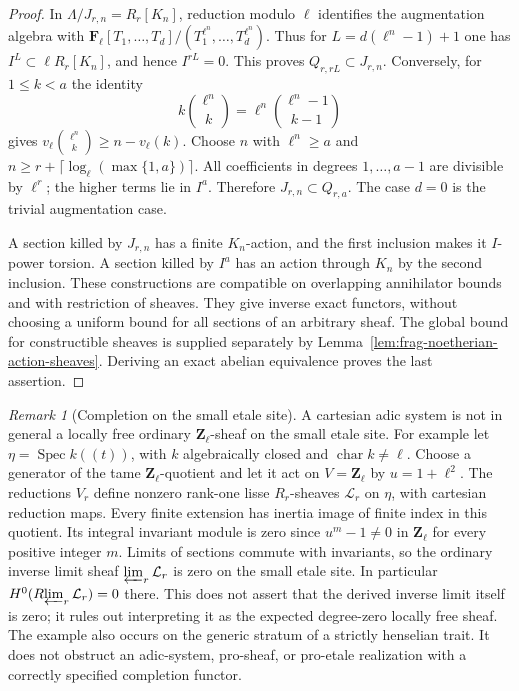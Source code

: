 \documentclass[11pt]{article}
\theoremstyle{definition}
\theoremstyle{remark}
\newtheorem{remark}[theorem]{Remark}
\newcommand{\Spec}{\operatorname{Spec}}
\begin{document}
\begin{proof}
In $\Lambda/J_{r,n}=R_r[K_n]$, reduction modulo $\ell$ identifies the
augmentation algebra with
$\mathbf F_\ell[T_1,\ldots,T_d]/(T_1^{\ell^n},\ldots,T_d^{\ell^n})$.
Thus for $L=d(\ell^n-1)+1$ one has $I^L\subset\ell R_r[K_n]$,
and hence $I^{rL}=0$.  This proves $Q_{r,rL}\subset J_{r,n}$.
Conversely, for $1\le k<a$ the identity
\[
 k\binom{\ell^n}{k}=\ell^n\binom{\ell^n-1}{k-1}
\]
gives $v_\ell\binom{\ell^n}{k}\ge n-v_\ell(k)$.
Choose $n$ with $\ell^n\ge a$ and
$n\ge r+\lceil\log_\ell(\max\{1,a\})\rceil$.
All coefficients in degrees $1,\ldots,a-1$ are divisible by $\ell^r$;
the higher terms lie in $I^a$.  Therefore $J_{r,n}\subset Q_{r,a}$.
The case $d=0$ is the trivial augmentation case.

A section killed by $J_{r,n}$ has a finite $K_n$-action, and the first
inclusion makes it $I$-power torsion.  A section killed by $I^a$ has
an action through $K_n$ by the second inclusion.  These constructions
are compatible on overlapping annihilator bounds and with restriction
of sheaves.  They give inverse exact functors, without choosing a
uniform bound for all sections of an arbitrary sheaf.  The global
bound for constructible sheaves is supplied separately by
Lemma~\ref{lem:frag-noetherian-action-sheaves}.  Deriving an exact
abelian equivalence proves the last assertion.
\end{proof}

\begin{remark}[Completion on the small etale site]
\label{rem:frag-small-etale-completion-test}
A cartesian adic system is not in general a locally free ordinary
$\mathbf Z_\ell$-sheaf on the small etale site.  For example let
$\eta=\Spec k((t))$, with $k$ algebraically closed and
$\operatorname{char}k\ne\ell$.  Choose a generator of the tame
$\mathbf Z_\ell$-quotient and let it act on $V=\mathbf Z_\ell$ by
$u=1+\ell^2$.  The reductions $V_r$ define nonzero rank-one lisse
$R_r$-sheaves $\mathcal L_r$ on $\eta$, with cartesian reduction maps.
Every finite extension has inertia image of finite index in this
quotient.  Its integral invariant module is zero since
$u^m-1\ne0$ in $\mathbf Z_\ell$ for every positive integer $m$.
Limits of sections commute with invariants, so the ordinary inverse
limit sheaf $\varprojlim_r\mathcal L_r$ is zero on the small etale site.
In particular $H^0(R\!\varprojlim_r\mathcal L_r)=0$ there.  This does
not assert that the derived inverse limit itself is zero; it rules
out interpreting it as the expected degree-zero locally free sheaf.
The example also occurs on the generic stratum of a strictly henselian
trait.  It does not obstruct an adic-system, pro-sheaf, or pro-etale
realization with a correctly specified completion functor.
\end{remark}
\end{document}
